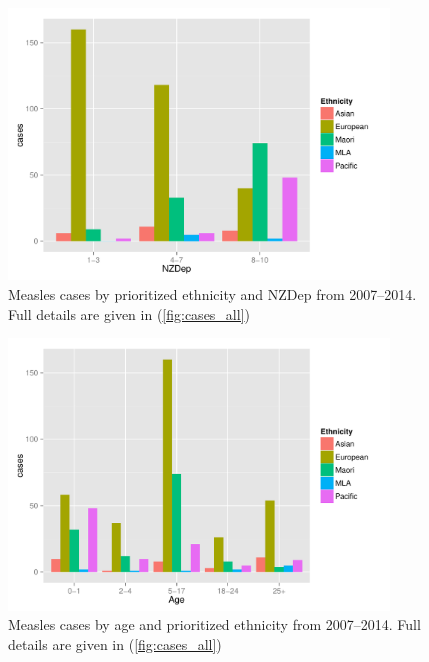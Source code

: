 \documentclass{article}
\begin{document}
\begin{figure}[H]
     \begin{center}
     \includegraphics[width=0.9\textwidth]{case_eth_nzdep.pdf}
     \end{center}
     \caption{Measles cases by prioritized ethnicity and NZDep from 2007--2014. Full details are given in (\autoref{fig:cases_all})}
     \label{fig:CaseNzdepEth}
\end{figure}

\begin{figure}[H]
     \begin{center}
     \includegraphics[width=0.9\textwidth]{case_age_eth.pdf}
     \end{center}
     \caption{Measles cases by age and prioritized ethnicity from 2007--2014. Full details are given in (\autoref{fig:cases_all})}
     \label{fig:CaseAgeEth}
\end{figure}
\end{document}
